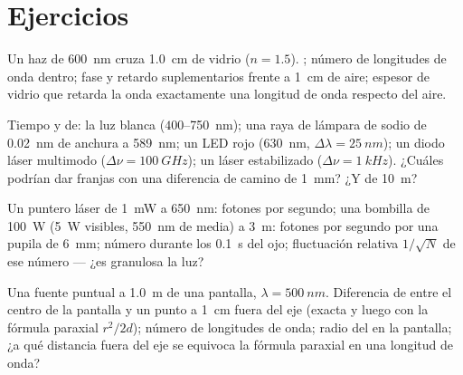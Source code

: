 \section{Ejercicios}

\begin{exercise}[$\star$]\label{exo:b2:scalar-light-model:1}
Un haz de \qty{600}{nm} cruza \qty{1.0}{cm} de vidrio ($n = 1.5$). ; número de longitudes de onda dentro; fase y retardo suplementarios
frente a \qty{1}{cm} de aire; espesor de vidrio que retarda la
onda exactamente una longitud de onda respecto del aire.
\end{exercise}

\begin{exercise}[$\star$]\label{exo:b2:scalar-light-model:2}
Tiempo y  de: la luz blanca ($400$--\qty{750}{nm}); una raya de
lámpara de sodio de \qty{0.02}{nm} de anchura a \qty{589}{nm}; un LED rojo (\qty{630}{nm},
$\Delta\lambda = \qty{25}{nm}$); un diodo láser multimodo ($\Delta\nu = \qty{100}{GHz}$); un
láser estabilizado ($\Delta\nu = \qty{1}{kHz}$). ¿Cuáles podrían dar franjas con una
diferencia de camino de \qty{1}{mm}? ¿Y de \qty{10}{m}?
\end{exercise}

\begin{exercise}[$\star$]\label{exo:b2:scalar-light-model:3}
Un puntero láser de \qty{1}{mW} a \qty{650}{nm}: fotones por segundo; una
bombilla de \qty{100}{W} (\qty{5}{W} visibles, \qty{550}{nm} de media) a \qty{3}{m}: fotones por
segundo por una pupila de \qty{6}{mm}; número durante los \qty{0.1}{s} del ojo;
fluctuación relativa $1/\sqrt N$ de ese número --- ¿es granulosa la luz?
\end{exercise}

\begin{exercise}[$\star$]\label{exo:b2:scalar-light-model:4}
Una fuente puntual a \qty{1.0}{m} de una pantalla, $\lambda = \qty{500}{nm}$. Diferencia
de  entre el centro de la pantalla y un punto a \qty{1}{cm}
fuera del eje (exacta y luego con la fórmula paraxial $r^2/2d$); número de
longitudes de onda; radio del  en la pantalla; ¿a qué
distancia fuera del eje se equivoca la fórmula paraxial en una longitud de onda?
\end{exercise}


